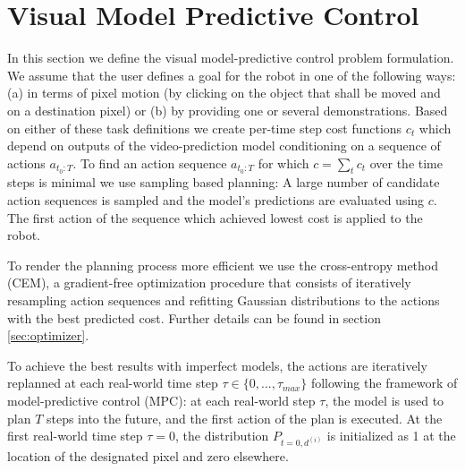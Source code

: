 \section{Visual Model Predictive Control}\label{sec:prelim}
\label{sec:vmpc}

In this section we define the visual model-predictive control problem formulation. We assume that the user defines a goal for the robot in one of the following ways: (a) in terms of pixel motion (by clicking on the object that shall be moved and on a destination pixel) or (b) by providing one or several demonstrations. Based on either of these task definitions we create per-time step cost functions $c_t$ which depend on outputs of the video-prediction model conditioning on a sequence of actions $a_{t_0:T}$. To find an action sequence $a_{t_0:T}$ for which $c = \sum_t{c_t}$ over the time steps is minimal we use sampling based planning: A large number of candidate action sequences is sampled and the model's predictions are evaluated using $c$. The first action of the sequence which achieved lowest cost is applied to the robot.

To render the planning process more efficient we use the cross-entropy method (CEM), a gradient-free optimization procedure that consists of iteratively resampling action sequences and refitting Gaussian distributions to the actions with the best predicted cost. Further details can be found in section \ref{sec:optimizer}.

To achieve the best results with imperfect models, the actions are iteratively replanned at each real-world time step $\tau \in \{0,...,\tau_{max}\}$ following the framework of model-predictive control (MPC): at each real-world step $\tau$, the model is used to plan $T$ steps into the future, and the first action of the plan is executed.
At the first real-world time step $\tau=0$, the distribution $P_{t=0, d^{(i)}} $ is initialized as 1 at the location of the designated pixel and zero elsewhere. 



